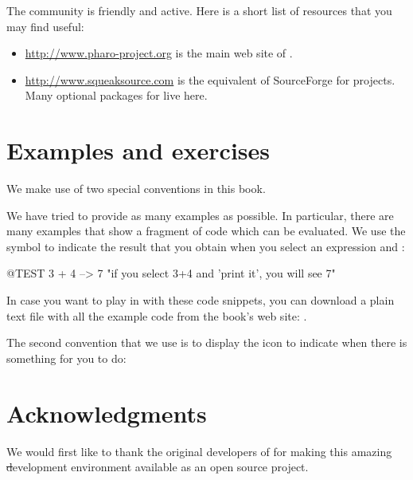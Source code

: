 \documentclass[a4paper,10pt,twoside]{book}
\begin{document}
The \pharo community is friendly and active.
Here is a short list of resources that you may find useful:

\begin{itemize}
\item \url{http://www.pharo-project.org} is the main web site of \pharo.

\item \url{http://www.squeaksource.com} is the equivalent of SourceForge for \pharo projects.
Many optional packages for \pharo live here.
\end{itemize}

\section*{Examples and exercises}

We make use of two special conventions in this book.

We have tried to provide as many examples as possible.
In particular, there are many examples that show a fragment of code which can be evaluated.  We use the symbol \ct{-->} to indicate the result that you obtain when you select an expression and :

\begin{code}{@TEST}
3 + 4 --> 7    "if you select 3+4 and 'print it', you will see 7"
\end{code}

In case you want to play in \pharo with these code snippets, you can download a plain text file with all the example code from the book's web site: \pbe.

The second convention that we use is to display the icon \dothisicon{} to indicate when there is something for you to do:


\section*{Acknowledgments}

We would first like to thank the original developers of \squeak for making this amazing \st development environment available as an open source project.
\end{document}
